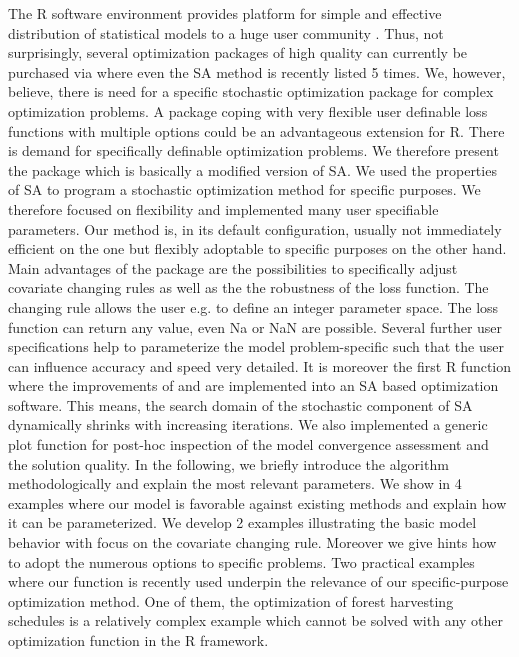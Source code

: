 The R software environment provides platform for simple and effective distribution of statistical models to a huge user community \citep{xiang_2013}. Thus, not surprisingly, several optimization packages of high quality can currently be purchased via  \citep{theussl_2016} where even the SA method is recently listed 5 times. We, however, believe, there is need for a specific stochastic optimization package for complex optimization problems. A package coping with very flexible user definable loss functions with multiple options could be an advantageous extension for R. There is demand for specifically definable optimization problems. We therefore present the package  which is basically a modified version of SA. We used the properties of SA to program a stochastic optimization method for specific purposes. We therefore focused on flexibility and implemented many user specifiable parameters. Our method is, in its default configuration, usually not immediately efficient on the one but flexibly adoptable to specific purposes on the other hand. Main advantages of the package are the possibilities to specifically adjust covariate changing rules as well as the the robustness of the loss function. The changing rule allows the user e.g. to define an integer parameter space. The loss function can return any value, even Na or NaN are possible. Several further user specifications help to parameterize the model problem-specific such that the user can influence accuracy and speed very detailed. It is moreover the first R function where the improvements of \citet{corana_1987} and \citet{pronzato_1984} are implemented into an SA based optimization software. This means, the search domain of the stochastic component of SA dynamically shrinks with increasing iterations. We also implemented a generic plot function for post-hoc inspection of the model convergence assessment and the solution quality. In the following, we briefly introduce the algorithm methodologically and explain the most relevant parameters. We show in 4 examples where our model is favorable against existing methods and explain how it can be parameterized. We develop 2 examples illustrating the basic model behavior with focus on the covariate changing rule. Moreover we give hints how to adopt the numerous options to specific problems. Two practical examples where our function is recently used underpin the relevance of our specific-purpose optimization method. One of them, the optimization of forest harvesting schedules is a relatively complex example which cannot be solved with any other optimization function in the R framework.

